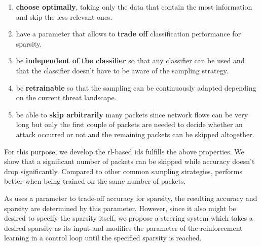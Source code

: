 \documentclass[conference]{IEEEtran}
\begin{document}
\begin{enumerate}
\item \textbf{choose optimally}, taking only the data that contain the most information and skip the less relevant ones. 
\item have a parameter that allows to \textbf{trade off} classification performance for sparsity.
\item be \textbf{independent of the classifier} so that any classifier can be used and that the classifier doesn't have to be aware of the sampling strategy. 
\item be \textbf{retrainable} so that the sampling can be continuously adapted depending on the current threat landscape. 
\item be able to \textbf{skip arbitrarily} many packets since network flows can be very long but only the first couple of packets are needed to decide whether an attack occurred or not and the remaining packets can be skipped altogether. 
\end{enumerate}


For this purpose, we develop the \gls{rl}-based \gls{ids} \textit{\ours{}} fulfills the above properties. We show that a significant number of packets can be skipped while accuracy doesn't drop significantly. Compared to other common sampling strategies, \ours{} performs better when being trained on the same number of packets. 


As \ours{} uses a parameter to trade-off accuracy for sparsity, the resulting accuracy and sparsity are determined by this parameter. However, since it also might be desired to specify the sparsity itself, we propose a steering system which takes a desired sparsity as its input and modifies the parameter of the reinforcement learning in a control loop until the specified sparsity is reached. 

\end{document}
